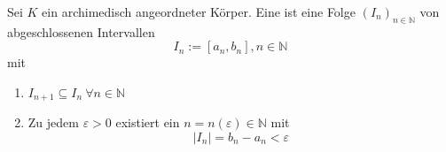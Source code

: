 Sei $K$ ein archimedisch angeordneter Körper. Eine  ist eine Folge $(I_n)_{n \in \mathbb{N}}$ von abgeschlossenen Intervallen
$$I_n := [a_n, b_n], n \in \mathbb{N}$$
mit
\begin{enumerate}
    \item $I_{n+1} \subseteq I_n \ \forall n \in \mathbb{N}$
    \item Zu jedem $\varepsilon > 0$ existiert ein $n = n(\varepsilon) \in \mathbb{N}$ mit
    $$|I_n| = b_n - a_n < \varepsilon$$
\end{enumerate}